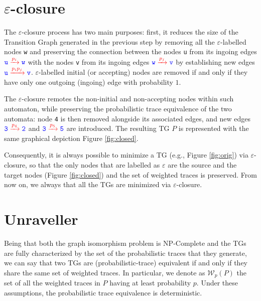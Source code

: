 \section{$\varepsilon$-closure}\label{sec:clos}
The $\varepsilon$-closure process has two main purposes: first, it reduces the size of the Transition Graph generated in the previous step by removing all the $\varepsilon$-labelled nodes \texttt{\color{blue}w} and preserving the connection between  the nodes \texttt{\color{blue}u} from its ingoing edges   $\texttt{\color{blue}u}\xrightarrow{\color{red}p_i}\texttt{\color{blue}w}$ with the nodes \texttt{\color{blue}v} from its ingoing edges   $\texttt{\color{blue}w}\xrightarrow{\color{red}p_j}\texttt{\color{blue}v}$ by establishing new edges $\texttt{\color{blue}u}\xrightarrow{\color{red}p_ip_j}\texttt{\color{blue}v}$. $\varepsilon$-labelled initial (or accepting) nodes are removed if and only if they have only one outgoing (ingoing) edge with probability $1$.

\begin{example}
	The $\varepsilon$-closure remotes the non-initial and non-accepting nodes within such automaton, while preserving the probabilistic trace equivalence of the two automata: node \texttt{\color{blue}4} is then removed alongside its associated edges, and new edges $\texttt{\color{blue}3}\xrightarrow{\color{red}p_4}\texttt{\color{blue}2}$ and $\texttt{\color{blue}3}\xrightarrow{\color{red}p_5}\texttt{\color{blue}5}$ are introduced. The resulting TG $P$ is represented with the same graphical depiction Figure \ref{fig:closed}.
\end{example}

Consequently, it is always possible to minimize a TG  (e.g., Figure \ref{fig:orig}) via $\varepsilon$-closure, so that the only nodes that are labelled as $\varepsilon$ are the source and the target nodes (Figure \ref{fig:closed}) and the set of weighted traces is preserved. From now on, we always that all the TGs are minimized via $\varepsilon$-closure. 

\section{Unraveller}\label{sec:unrav}
Being that both the graph isomorphism problem is NP-Complete and the TGs are fully characterized by the set of the probabilistic traces that they generate,  we can say that two TGs are (probabilistic-trace) equivalent if and only if they share the same set of weighted traces. In particular, we denote as $\mathcal{W}_p(P)$ the set of all the weighted traces in $P$ having at least probability $p$. Under these assumptions, the probabilistic trace equivalence is deterministic.

